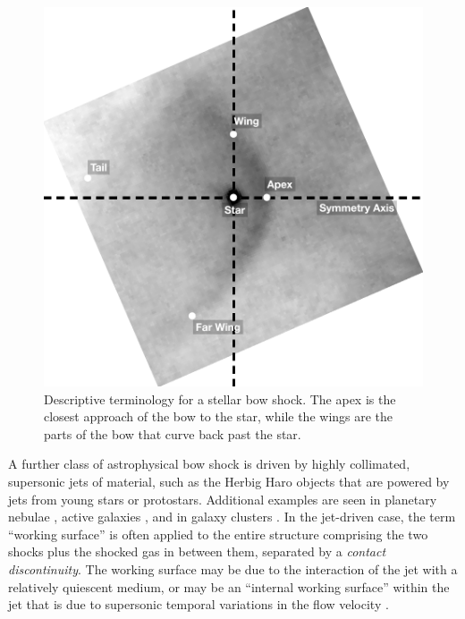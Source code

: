 \begin{figure}
  \centering
  \bigskip
  \includegraphics[width=0.9\linewidth]{figs/bow-terminology}
  \caption{Descriptive terminology for a stellar bow shock.  The apex
    is the closest approach of the bow to the star, while the wings
    are the parts of the bow that curve back past the star.}
  \label{fig:bow-terminology}
\end{figure}
A further class of astrophysical bow shock is driven by highly
collimated, supersonic jets of material, such as the Herbig Haro
objects \citep{Schwartz:1978b, Hartigan:1987a} that are powered by
jets from young stars or protostars.  Additional examples are seen in
planetary nebulae \citep{Phillips:2010a, Meaburn:2013a}, active
galaxies \citep{Wilson:1987a}, and in galaxy clusters
\citep{Markevitch:2002a}.  In the jet-driven case, the term ``working
surface'' is often applied to the entire structure comprising the two
shocks plus the shocked gas in between them, separated by a
\textit{contact discontinuity}.  The working surface may be due to the
interaction of the jet with a relatively quiescent medium, or may be an
``internal working surface'' within the jet that is due to
supersonic temporal variations in the flow velocity
\citep{Raga:1990a}.

